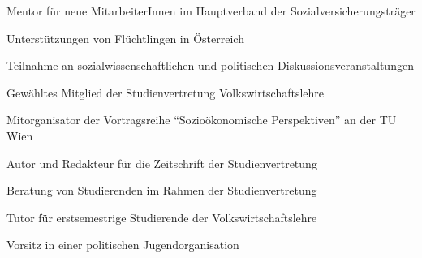 

	{\begin{cvenumerate}
		\item Mentor für neue MitarbeiterInnen im Hauptverband der Sozialversicherungsträger
		\item Unterstützungen von Flüchtlingen in Österreich
		\item Teilnahme an sozialwissenschaftlichen und politischen Diskussionsveranstaltungen
	\end{cvenumerate}}

{\begin{cvenumerate}
		\item Gewähltes Mitglied der Studienvertretung Volkswirtschaftslehre
		\item Mitorganisator der Vortragsreihe "`Sozioökonomische Perspektiven"' an der TU Wien
		\item Autor und Redakteur für die Zeitschrift der Studienvertretung
		\item Beratung von Studierenden im Rahmen der Studienvertretung
		\item Tutor für erstsemestrige Studierende der Volkswirtschaftslehre
		\item Vorsitz in einer politischen Jugendorganisation
	\end{cvenumerate}}